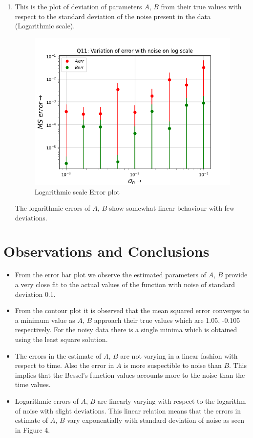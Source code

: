 \documentclass[12pt, a4paper]{report}
\begin{document}
\begin{enumerate}
    \item This is the plot of deviation of parameters $A$, $B$ from their true
    values with respect to the standard deviation of the noise present in the data (Logarithmic scale).
    \begin{figure}[H]
        \centering
        \includegraphics[scale = 0.8]{Figure_4.png}
        \caption{Logarithmic scale Error plot}
        \label{fig:sample}
    \end{figure}
    The logarithmic errors of $A$, $B$ show somewhat linear behaviour with few deviations.    
\end{enumerate}

\section*{Observations and Conclusions}
   \begin{itemize}
    \item From the error bar plot we observe the estimated parameters of $A$, $B$ provide a very close fit to the
actual values of the function with noise of standard deviation $0.1$.
  	\item From the contour plot it is observed that the mean squared error converges to a minimum value
as $A$, $B$ approach their true values which are 1.05, -0.105 respectively. For the noisy data there is a single 
minima which is obtained using the least square solution.
  	\item The errors in the estimate of $A$, $B$ are not varying in a linear fashion
with respect to time. Also the error in $A$ is more suspectible to noise than $B$. This implies that
the Bessel's function values accounts more to the noise than the time values.
    \item Logarithmic errors of $A$, $B$ are linearly varying with respect to the logarithm of noise
with slight deviations. This linear relation means that the errors in estimate of $A$, $B$ vary exponentially with
standard deviation of noise as seen in Figure 4. 
  \end{itemize}
\end{document}
